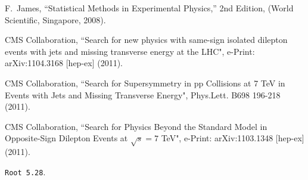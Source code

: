 \begin{thebibliography}{10}
F.~James, ``Statistical Methods in Experimental Physics,''  2nd Edition, (World Scientific, Singapore, 2008).

CMS Collaboration, ``Search for new physics with same-sign isolated dilepton events with jets and missing transverse energy at the LHC", e-Print: arXiv:1104.3168 [hep-ex] (2011).

CMS Collaboration, ``Search for Supersymmetry in pp Collisions at 7 TeV in Events with Jets and Missing Transverse Energy", Phys.Lett. B698 196-218 (2011).

CMS Collaboration, ``Search for Physics Beyond the Standard Model in Opposite-Sign Dilepton Events at  $\sqrt{s} = 7$ TeV", e-Print: arXiv:1103.1348 [hep-ex] (2011).


{\tt Root 5.28}.

\end{thebibliography}

